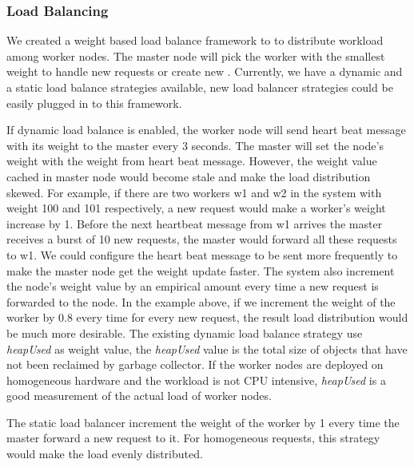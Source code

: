 \requestdispatchdiagram{}

\subsubsection{Load Balancing}
\label{sec:lb}
We created a weight based load balance framework to to distribute workload among worker nodes.
The master node will pick the worker with the smallest weight 
to handle new requests or create new \appins{}.
Currently, we have a dynamic and a static load balance strategies available,
new load balancer strategies could be easily plugged in to this framework.

If dynamic load balance is enabled,
the worker node will send heart beat message with its weight
 to the master every 3 seconds.
The master will set the node's weight with the weight from heart beat message.
However, 
the weight value cached in master node would become stale and make the
load distribution skewed.
For example, if there are two workers w1 and w2 in the system with weight
100 and 101 respectively, 
a new request would make a worker's weight increase by 1.
Before the next heartbeat message from w1 arrives the master receives
a burst of 10 new requests, 
the master would forward all these requests to w1.
We could configure the heart beat message to be sent more frequently
 to make the master node get the weight update faster.
The system also increment the node's weight value by an empirical amount
every time a new request is forwarded to the node.
In the example above, if we increment the weight of the worker
by 0.8 every time for every new request,
the result load distribution would be much more desirable.
The existing dynamic load balance strategy use \emph{heapUsed} as weight value,
the \emph{heapUsed} value is the total size of \js{} objects that have not been
reclaimed by garbage collector.
If the worker nodes are deployed on homogeneous hardware
and the workload is not CPU intensive,
\emph{heapUsed} is a good measurement of the actual load of worker nodes.

The static load balancer increment the weight of the worker by 1 every time
the master forward a new request to it.
For homogeneous requests, this strategy would make the load evenly distributed.


